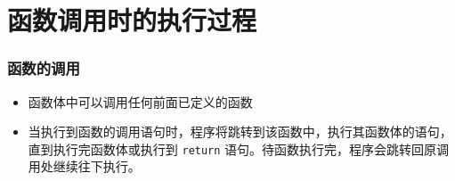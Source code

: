 \section{函数调用时的执行过程}

\begin{frame}[fragile]
    \frametitle{函数的调用}

    \begin{itemize}
        \item 函数体中可以调用任何前面已定义的函数
        \item 当执行到函数的调用语句时，程序将跳转到该函数中，执行其函数体的语句，直到执行完函数体或执行到 \lstinline|return| 语句。待函数执行完，程序会跳转回原调用处继续往下执行。
    \end{itemize}
\end{frame}

